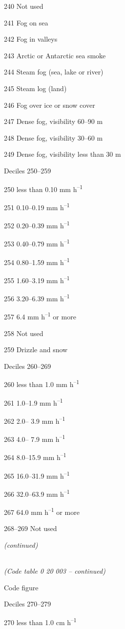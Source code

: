240 Not used

241 Fog on sea

242 Fog in valleys

243 Arctic or Antarctic sea smoke

244 Steam fog (sea, lake or river)

245 Steam log (land)

246 Fog over ice or snow cover

247 Dense fog, visibility 60--90 m

248 Dense fog, visibility 30--60 m

249 Dense fog, visibility less than 30 m

Deciles 250--259

250 less than 0.10 mm h\textsuperscript{--1}

251 0.10--0.19 mm h\textsuperscript{--1}

252 0.20--0.39 mm h\textsuperscript{--1}

253 0.40--0.79 mm h\textsuperscript{--1}

254 0.80--1.59 mm h\textsuperscript{--1}

255 1.60--3.19 mm h\textsuperscript{--1}

256 3.20--6.39 mm h\textsuperscript{--1}

257 6.4 mm h\textsuperscript{--1} or more

258 Not used

259 Drizzle and snow

Deciles 260--269

260 less than 1.0 mm h\textsuperscript{--1}

261 1.0--1.9 mm h\textsuperscript{--1}

262 2.0-- 3.9 mm h\textsuperscript{--1}

263 4.0-- 7.9 mm h\textsuperscript{--1}

264 8.0--15.9 mm h\textsuperscript{--1}

265 16.0--31.9 mm h\textsuperscript{--1}

266 32.0--63.9 mm h\textsuperscript{--1}

267 64.0 mm h\textsuperscript{--1} or more

268--269 Not used

\emph{(continued)}

\emph{\\
(Code table 0 20 003 -- continued)}

Code figure

Deciles 270--279

270 less than 1.0 cm h\textsuperscript{--1}


